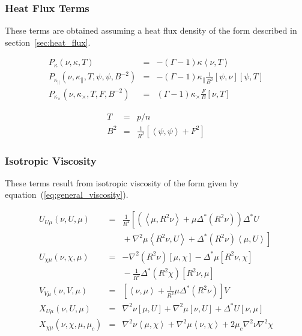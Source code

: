 \documentclass[letterpaper]{book}
\newcommand{\gs}[1]{\Delta^* #1}
\newcommand{\lp}[1]{\nabla^2 #1}
\newcommand{\pb}[2]{\left[#1,#2\right]}
\newcommand{\ip}[2]{\left\langle  #1,#2\right\rangle}
\begin{document}
\subsubsection{Heat Flux Terms}

These terms are obtained assuming a heat flux density of the form
described in section~\ref{sec:heat_flux}.

\begin{equation}
  \begin{array}{lcl}
    P_\kappa(\nu, \kappa, T) & = &
    -(\Gamma - 1) \kappa \ip{\nu}{T}
    \\
    P_{\kappa_\parallel}(\nu, \kappa_\parallel, T, \psi, \psi, B^{-2}) & = &
    -(\Gamma - 1) \kappa_\parallel \frac{1}{B^2} \pb{\psi}{\nu} \pb{\psi}{T}
    \\
    P_{\kappa_\times}(\nu, \kappa_\times, T, F, B^{-2}) & = & 
    (\Gamma - 1) \kappa_\times \frac{F}{B} \pb{\nu}{T}
  \end{array}
\end{equation}

\begin{eqnarray*}
  T & = & p/n \\
  B^2 & = & \frac{1}{R^2} \left[ \ip{\psi}{\psi} + F^2 \right]
\end{eqnarray*}


\subsubsection{Isotropic Viscosity}

These terms result from isotropic viscosity of the form given by
equation~(\ref{eq:general_viscosity}).

\begin{equation}
  \begin{array}{lcl}
    U_{U \mu}(\nu, U, \mu) & = & \frac{1}{R^2} \left [ \left(
      \ip{\mu}{R^2 \nu} + \mu \gs{(R^2 \nu)} \right) \gs{U} \right. \\
      & & \left. \mbox{} + \lp{\mu} \ip{R^2 \nu}{U} 
      + \gs{(R^2 \nu)} \ip{\mu}{U} \right]
    \\
    U_{\chi \mu}(\nu, \chi, \mu) & = & -\lp{(R^2 \nu)} \pb{\mu}{\chi}
      - \gs{\mu}\pb{R^2\nu}{\chi} \\ & & \mbox{}
      - \frac{1}{R^2}\gs{(R^2 \chi)} \pb{R^2 \nu}{\mu}
    \\
    V_{V \mu}(\nu, V, \mu) & = & \left[\ip{\nu}{\mu} 
      + \frac{1}{R^2}\mu \gs{(R^2 \nu)} \right] V
    \\
    X_{U \mu}(\nu, U, \mu) & = & \lp{\nu} \pb{\mu}{U} 
      + \lp{\mu} \pb{\nu}{U} + \gs{U} \pb{\nu}{\mu}
    \\
    X_{\chi \mu}(\nu, \chi, \mu, \mu_c) & = & 
      \lp{\nu} \ip{\mu}{\chi} + \lp{\mu} \ip{\nu}{\chi}
      + 2 \mu_c \lp{\nu} \lp{\chi}
  \end{array}
\end{equation}
\end{document}
